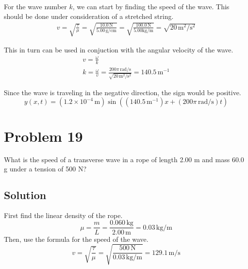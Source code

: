 \documentclass[12pt]{article}
\newcommand{\E}[1]{\times 10^{#1}}
\begin{document}
            For the wave number $k$, we can start by finding the speed of the wave.
            This should be done under consideration of a stretched string.
            \begin{gather}
                v   =   \sqrt{\frac{\tau}{\mu}}
                    =   \sqrt{\frac{10.0\,\unit{\newton}}{5.00\,\unit{\gram/\centi\meter}}}
                    =   \sqrt{\frac{100.0\,\unit{\newton}}{5.00\unit{\kilo\gram/\meter}}}
                    =   \sqrt{20\,\unit{\meter^2/\second^2}}
            \end{gather}

            This in turn can be used in conjuction with the angular velocity of the wave. 
            \begin{gather}
                v   =   \frac{\omega}{k}\\
                k   =   \frac{\omega}{v}
                    =   \frac{200\pi\,\unit{\radian/\second}}{\sqrt{20\,\unit{\meter^2/\second^2}}}
                    =   140.5\,\unit{\meter^{-1}}
            \end{gather}

            Since the wave is traveling in the negative direction, the sign would be positive.
            \begin{equation}
                \boxed{y(x,t)   =   (1.2\E{-4}\,\unit{\meter})\sin((140.5\,\unit{\meter^{-1}})x + (200\pi\,\unit{\radian/\second})t)}
            \end{equation}

    \pagebreak
    \section{Problem 19}
        What is the speed of a transverse wave in a rope of length 2.00 m and mass 60.0 g under a tension of 500 N?

        \subsection{Solution}
            First find the linear density of the rope.
            \begin{equation}
                \mu =   \frac{m}{L}
                    =   \frac{0.060\,\unit{\kilo\gram}}{2.00\,\unit{\meter}}
                    =   0.03\,\unit{\kilo\gram/\meter}
            \end{equation}
            Then, use the formula for the speed of the wave. 
            \begin{equation}
                v   =   \sqrt{\frac{\tau}{\mu}}
                    =   \sqrt{\frac{500\,\unit{\newton}}{0.03\,\unit{\kilo\gram/\meter}}}
                    =   \boxed{129.1\,\unit{\meter/\second}}
            \end{equation}
\end{document}
